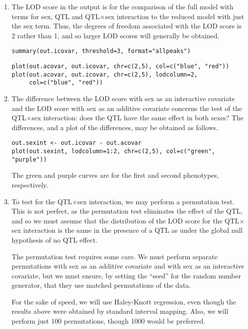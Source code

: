 \documentclass[10pt,letterpaper]{article}
\newcommand{\usercolor}{\color [named]{BlueViolet}}
\begin{document}
\begin{enumerate}
\item The LOD score in the output is for the comparison of the full
  model with terms for sex, QTL and QTL$\times$sex interaction to the reduced
  model with just the sex term.  Thus, the degrees of freedom
  associated with the LOD score is 2 rather than 1, and so larger LOD
  scores will generally be obtained.

\usercolor
\verb|summary(out.icovar, threshold=3, format="allpeaks")|
\normalcolor

\usercolor
\verb|plot(out.acovar, out.icovar, chr=c(2,5), col=c("blue", "red"))| \\
\verb|plot(out.acovar, out.icovar, chr=c(2,5), lodcolumn=2,| \\
\verb|     col=c("blue", "red"))|
\normalcolor

\item The difference between the LOD score with sex as an interactive
  covariate and the LOD score with sex as an additive covariate
  concerns the test of the QTL$\times$sex interaction: does the QTL
  have the same effect in both sexes?  The differences, and a plot of
  the differences, may be obtained as follows.

\usercolor
\verb|out.sexint <- out.icovar - out.acovar| \\
\verb|plot(out.sexint, lodcolumn=1:2, chr=c(2,5), col=c("green", "purple"))|
\normalcolor

The green and purple curves are for the first and second phenotypes,
respectively.  

\item To test for the QTL$\times$sex interaction, we may perform a
  permutation test.  This is not perfect, as the permutation test
  eliminates the effect of the QTL, and so we must assume that the
  distribution of the LOD score for the QTL$\times$sex interaction is
  the same in the presence of a QTL as under the global null
  hypothesis of no QTL effect.

  The permutation test requires some care.  We must perform
  separate permutations with sex as an additive covariate and with sex
  as an interactive covariate, but we must ensure, by setting the
  ``seed'' for the random number generator, that they use matched
  permutations of the data.

  For the sake of speed, we will use Haley-Knott regression, even
  though the results above were obtained by standard interval
  mapping. Also, we will perform just 100 permutations, though 1000
  would be preferred.


\end{enumerate}
\end{document}
